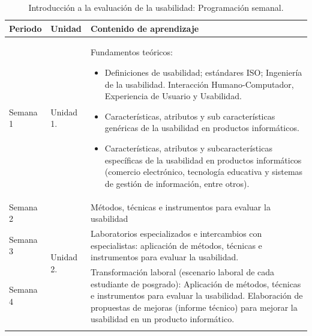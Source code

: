 \documentclass{textolivre}
\begin{document}
\begin{table}[htbp]
\caption{Introducción a la evaluación de la usabilidad: Programación semanal.}
\label{tab1}
\centering
\begin{tabular}{p{}p{}p{}}
\toprule
Periodo  & Unidad  & Contenido de aprendizaje
\\
\midrule
\arrayrulecolor[gray]{.7}
Semana 1 & Unidad 1. & 
Fundamentos teóricos:
\begin{itemize}
    \item Definiciones de usabilidad; estándares ISO; Ingeniería de la usabilidad. Interacción Humano-Computador, Experiencia de Usuario y Usabilidad.
    \item Características, atributos y sub características genéricas de la usabilidad en productos informáticos.
    \item Características, atributos y subcaracterísticas específicas de la usabilidad en productos informáticos (comercio electrónico, tecnología educativa y sistemas de gestión de información, entre otros).
\end{itemize} \\
\midrule
Semana 2 & \multirow{3}{*}{Unidad 2.} & Métodos, técnicas e instrumentos para evaluar la usabilidad \\
Semana 3 & & Laboratorios especializados e intercambios con especialistas: aplicación de métodos, técnicas e instrumentos para evaluar la usabilidad. \\
Semana 4 & & Transformación laboral (escenario laboral de cada estudiante de posgrado): Aplicación de métodos, técnicas e instrumentos para evaluar la usabilidad. Elaboración de propuestas de mejoras (informe técnico) para mejorar la usabilidad en un producto informático. \\
\arrayrulecolor{black}
\bottomrule
\end{tabular}
\end{table}
\end{document}
